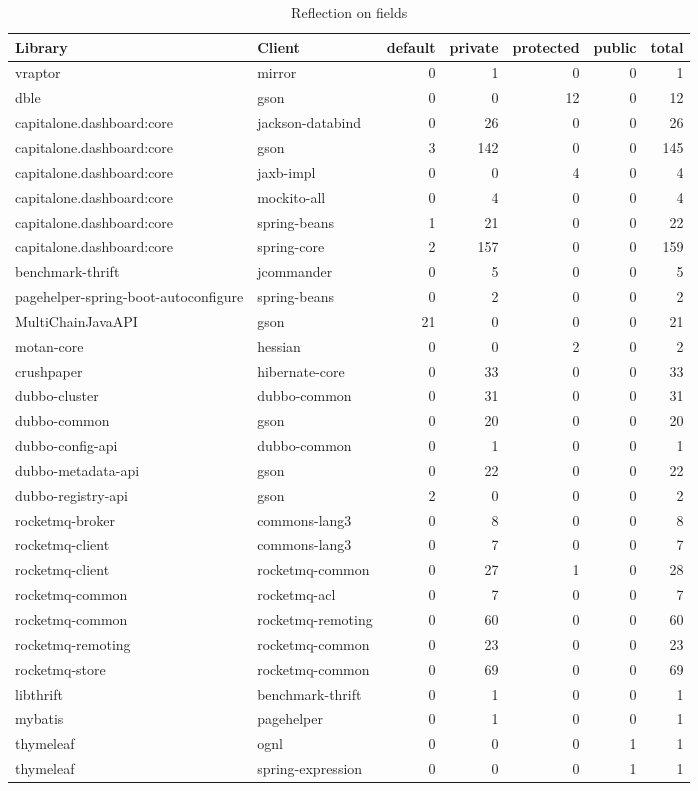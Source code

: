 \begin{table}[ht]
\centering
\begingroup\small
\begin{tabular}{llrrrrr}
  \hline
Library & Client & default & private & protected & public & total \\ 
  \hline
vraptor & mirror & 0 & 1 & 0 & 0 & 1 \\ 
  dble & gson & 0 & 0 & 12 & 0 & 12 \\ 
  capitalone.dashboard:core & jackson-databind & 0 & 26 & 0 & 0 & 26 \\ 
  capitalone.dashboard:core & gson & 3 & 142 & 0 & 0 & 145 \\ 
  capitalone.dashboard:core & jaxb-impl & 0 & 0 & 4 & 0 & 4 \\ 
  capitalone.dashboard:core & mockito-all & 0 & 4 & 0 & 0 & 4 \\ 
  capitalone.dashboard:core & spring-beans & 1 & 21 & 0 & 0 & 22 \\ 
  capitalone.dashboard:core & spring-core & 2 & 157 & 0 & 0 & 159 \\ 
  benchmark-thrift & jcommander & 0 & 5 & 0 & 0 & 5 \\ 
  pagehelper-spring-boot-autoconfigure & spring-beans & 0 & 2 & 0 & 0 & 2 \\ 
  MultiChainJavaAPI & gson & 21 & 0 & 0 & 0 & 21 \\ 
  motan-core & hessian & 0 & 0 & 2 & 0 & 2 \\ 
  crushpaper & hibernate-core & 0 & 33 & 0 & 0 & 33 \\ 
  dubbo-cluster & dubbo-common & 0 & 31 & 0 & 0 & 31 \\ 
  dubbo-common & gson & 0 & 20 & 0 & 0 & 20 \\ 
  dubbo-config-api & dubbo-common & 0 & 1 & 0 & 0 & 1 \\ 
  dubbo-metadata-api & gson & 0 & 22 & 0 & 0 & 22 \\ 
  dubbo-registry-api & gson & 2 & 0 & 0 & 0 & 2 \\ 
  rocketmq-broker & commons-lang3 & 0 & 8 & 0 & 0 & 8 \\ 
  rocketmq-client & commons-lang3 & 0 & 7 & 0 & 0 & 7 \\ 
  rocketmq-client & rocketmq-common & 0 & 27 & 1 & 0 & 28 \\ 
  rocketmq-common & rocketmq-acl & 0 & 7 & 0 & 0 & 7 \\ 
  rocketmq-common & rocketmq-remoting & 0 & 60 & 0 & 0 & 60 \\ 
  rocketmq-remoting & rocketmq-common & 0 & 23 & 0 & 0 & 23 \\ 
  rocketmq-store & rocketmq-common & 0 & 69 & 0 & 0 & 69 \\ 
  libthrift & benchmark-thrift & 0 & 1 & 0 & 0 & 1 \\ 
  mybatis & pagehelper & 0 & 1 & 0 & 0 & 1 \\ 
  thymeleaf & ognl & 0 & 0 & 0 & 1 & 1 \\ 
  thymeleaf & spring-expression & 0 & 0 & 0 & 1 & 1 \\ 
     \hline
\end{tabular}
\endgroup
\caption{\label{tab:refl-fields}Reflection on fields} 
\end{table}
